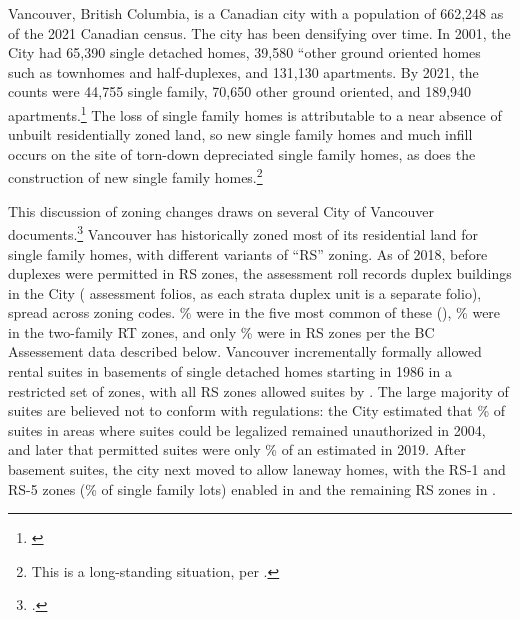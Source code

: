 \documentclass[12pt]{article}
\begin{document}
Vancouver, British Columbia, is a Canadian city with a population of 662,248 as
of the 2021 Canadian census. The city has been densifying over time. In 2001,
the City had 65,390 single detached homes, 39,580 ``other ground oriented homes
such as townhomes and half-duplexes, and 131,130 apartments. By 2021, the
counts were 44,755 single family, 70,650 other ground oriented, and 189,940
apartments.\footnote{\textcite{MetroVancouver2018HousingDataBook,MetroVancouver2025HousingDataBook}}
	The loss of single family homes is attributable to a near absence of
	unbuilt residentially zoned land, so new single family homes and much infill occurs on the site of torn-down depreciated single family homes, as does the construction of new single family homes.\footnote{This is a long-standing situation, per \textcite{RosenthalHelsley1994}.}

This discussion of zoning changes draws on several City of Vancouver documents.\footnote{\textcite{CoV2004Suites,CoV2019SuitesMemo,CoV2018LanewayReview,CoV2018DuplexReport,CoV2018DuplexAdmin,CoVRS1Schedule2023,CoV2023January,CoV2023MissingMiddle,CoVR1Schedule}.} Vancouver has historically zoned most of its residential land for single family homes, with different variants of ``RS'' zoning. As of 2018, before duplexes were permitted in RS zones, the assessment roll records \duplexBldgStockEighteen{} duplex buildings in the City (\duplexFolioStockEighteen{} assessment folios, as each strata duplex unit is a separate folio), spread across \duplexZoningCodesEighteen{} zoning codes. \duplexTopFiveZoneShareEighteen\% were in the five most common of these (\duplexTopFiveZonesEighteen), \duplexRTShareEighteen\% were in the two-family RT zones, and only \duplexRSShareEighteen\% were in RS zones per the BC Assessement data described below. Vancouver incrementally formally allowed rental suites in basements of single detached homes starting in 1986 in a restricted set of zones, with all RS zones allowed suites by \suitesAllRSYear{}. The large majority of suites are believed not to conform with regulations: the City estimated that \suitesIllegalShareTwoThousandFour\% of suites in areas where suites could be legalized remained unauthorized in 2004, and later that permitted suites were only \suitesPermittedShareTwentyNineteen\% of an estimated \suitesTotalTwentyNineteen{} in 2019. After basement suites, the city next moved to allow laneway homes, with the RS-1 and RS-5 zones (\lanewayFirstLotShare\% of single family lots) enabled in \lanewayFirstYear{}  and the remaining RS zones in \lanewayAllRSYear{}.
\end{document}
